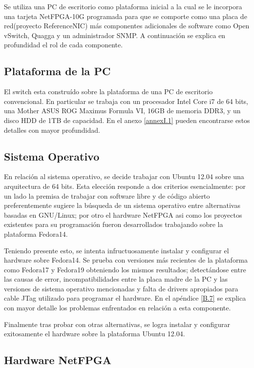 Se utiliza una PC de escritorio como plataforma inicial a la cual se le incorpora una tarjeta NetFPGA-10G programada para que se comporte como una placa de red(proyecto ReferenceNIC) m\'as componentes adicionales de software como Open vSwitch, Quagga y un administrador SNMP. A continuaci\'on se explica en profundidad el rol de cada componente.

\subsection{Plataforma de la PC}
El switch esta constru\'ido sobre la plataforma de una PC de escritorio convencional. En particular se trabaja con un procesador Intel Core i7 de 64 bits, una Mother ASUS ROG Maximus Formula VI, 16GB de memoria DDR3, y un disco HDD de 1TB de capacidad. En el anexo \ref{annexI.1} pueden encontrarse estos detalles con mayor profundidad.

\subsection{Sistema Operativo}
En relación al sistema operativo, se decide trabajar con Ubuntu 12.04 sobre una arquitectura de 64 bits. Esta elecci\'on responde a dos criterios esencialmente: por un lado la premisa de trabajar con software libre y de c\'odigo abierto preferentemente sugiere la b\'usqueda de un sistema operativo entre alternativas basadas en GNU/Linux; por otro el hardware NetFPGA asi como los proyectos existentes para su programaci\'on fueron desarrollados trabajando sobre la plataforma Fedora14. 

Teniendo presente esto, se intenta infructuosamente instalar y configurar el hardware sobre Fedora14. Se prueba con versiones m\'as recientes de la plataforma como Fedora17 y Fedora19 obteniendo los mismos resultados; detectándose entre las causas de error, incompatibilidades entre la placa madre de la PC y las versiones de sistema operativo mencionadas y falta de drivers apropiados para cable JTag utilizado para programar el hardware. En el apéndice \ref{B.7} se explica con mayor detalle los problemas enfrentados en relaci\'on a esta componente.

Finalmente tras probar con otras alternativas, se logra instalar y configurar exitosamente el hardware sobre la plataforma Ubuntu 12.04.

\subsection{Hardware NetFPGA}

